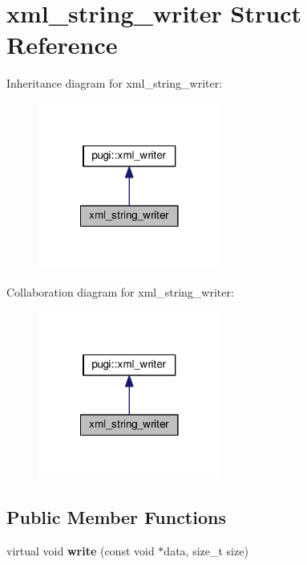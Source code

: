 \hypertarget{structxml__string__writer}{\section{xml\+\_\+string\+\_\+writer Struct Reference}
\label{structxml__string__writer}
}


Inheritance diagram for xml\+\_\+string\+\_\+writer\+:
\nopagebreak
\begin{figure}[H]
\begin{center}
\leavevmode
\includegraphics[width=170pt]{structxml__string__writer__inherit__graph}
\end{center}
\end{figure}


Collaboration diagram for xml\+\_\+string\+\_\+writer\+:
\nopagebreak
\begin{figure}[H]
\begin{center}
\leavevmode
\includegraphics[width=170pt]{structxml__string__writer__coll__graph}
\end{center}
\end{figure}
\subsection*{Public Member Functions}
\begin{DoxyCompactItemize}
\item 
\hypertarget{structxml__string__writer_aa23892a29996648523503b00425f90a2}{virtual void {\bfseries write} (const void $\ast$data, size\+\_\+t size)}\label{structxml__string__writer_aa23892a29996648523503b00425f90a2}

\end{DoxyCompactItemize}
